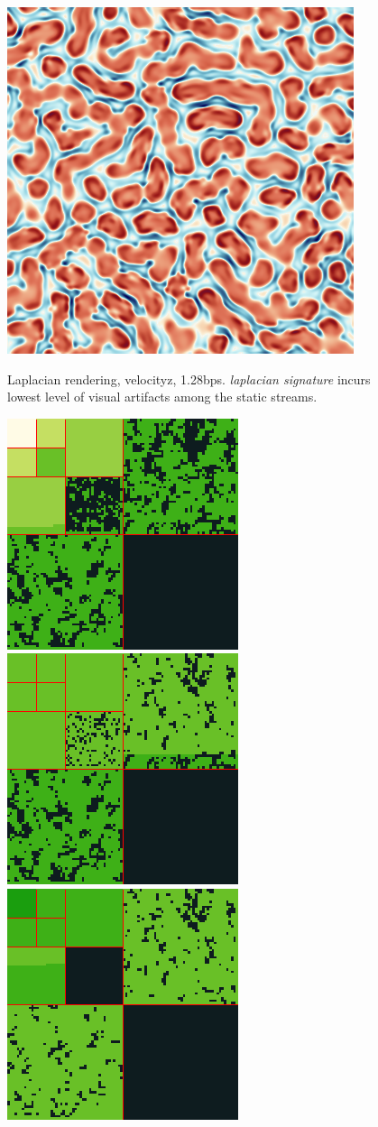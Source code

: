 \begin{figure}[h]
	{\includegraphics[width=0.32\linewidth]{img/laplacian/groundtruth_laplacian_0.png}}
	\caption{Laplacian rendering, velocityz, 1.28bps. \emph{laplacian signature} incurs lowest level of visual artifacts among the static streams.}
	\label{fig:laplacian-precision-comparison}
\end{figure}

\begin{figure}[h]
	{\includegraphics[width=0.32\linewidth]{img/laplacian/by-wavelet-norm.png}}
	{\includegraphics[width=0.32\linewidth]{img/laplacian/by-bit-plane.png}}
	{\includegraphics[width=0.32\linewidth]{img/laplacian/laplacian-signature.png}}

\end{figure}
